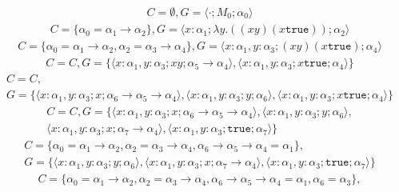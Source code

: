 \documentclass[11pt]{article}
\newcommand{\T}{\texttt{true}}
\newcommand{\rarr}{\rightarrow}
\begin{document}
\begin{enumerate}
	      \begin{align}
		      C = \emptyset, G = { \langle \cdot ; M_0 ; \alpha_0 \rangle }
	      \end{align}
	      \begin{align}
		      C = \{ \alpha_0 = \alpha_1 \rarr \alpha_2 \}, G = { \langle x: \alpha_1; \lambda y. ((xy)(x \texttt{true})); \alpha_2 \rangle  }
	      \end{align}
	      \begin{align}
		      C = \{ \alpha_0 = \alpha_1 \rarr \alpha_2, \alpha_2 = \alpha_3 \rarr \alpha_4 \}, G = { \langle x: \alpha_1, y: \alpha_3 ; (xy)(x \T); \alpha_4 \rangle  }
	      \end{align}
	      \begin{multline}
		      C = C, G = \{ \langle x: \alpha_1, y: \alpha_3 ; xy ; \alpha_5 \rarr \alpha_4 \rangle, \langle x: \alpha_1, y:\alpha_3 ; x\T; \alpha_4 \rangle   \}
	      \end{multline}
	      \begin{multline}
		      C = C, \\
		      G = \{ \langle x: \alpha_1, y:\alpha_3 ; x ; \alpha_6 \rarr \alpha_5\rarr \alpha_4  \rangle , \langle x: \alpha_1, y:\alpha_3 ; y ; \alpha_6  \rangle , \langle x: \alpha_1, y:\alpha_3 ; x\T; \alpha_4  \rangle  \} 
	      \end{multline}
	      \begin{multline}
		      C = C, G = \{ \langle x: \alpha_1, y:\alpha_3 ; x ; \alpha_6 \rarr \alpha_5\rarr \alpha_4  \rangle , \langle x: \alpha_1, y:\alpha_3 ; y ; \alpha_6 \rangle,\\ \langle  x: \alpha_1, y:\alpha_3 ; x ; \alpha_7 \rarr \alpha_4  \rangle, \langle x: \alpha_1, y:\alpha_3 ; \T ; \alpha_7 \rangle \}                                                      
	      \end{multline}
	      \begin{multline}
		      C = \{ \alpha_0 = \alpha_1 \rarr \alpha_2, \alpha_2 = \alpha_3 \rarr \alpha_4, \alpha_6 \rarr \alpha_5 \rarr \alpha_4 = \alpha_1 \},   \\ 
		      G = \{ \langle x: \alpha_1, y:\alpha_3 ; y ; \alpha_6 \rangle, \langle  x: \alpha_1, y:\alpha_3 ; x ; \alpha_7 \rarr \alpha_4  \rangle, \langle x: \alpha_1, y:\alpha_3 ; \T ; \alpha_7 \rangle \}  
	      \end{multline}
	      \begin{multline}
		      C = \{  \alpha_0 = \alpha_1 \rarr \alpha_2, \alpha_2 = \alpha_3 \rarr \alpha_4, \alpha_6 \rarr \alpha_5 \rarr \alpha_4 = \alpha_1, \alpha_6 = \alpha_3 \},                                                                  \\ 

\end{multline}
\end{enumerate}
\end{document}
